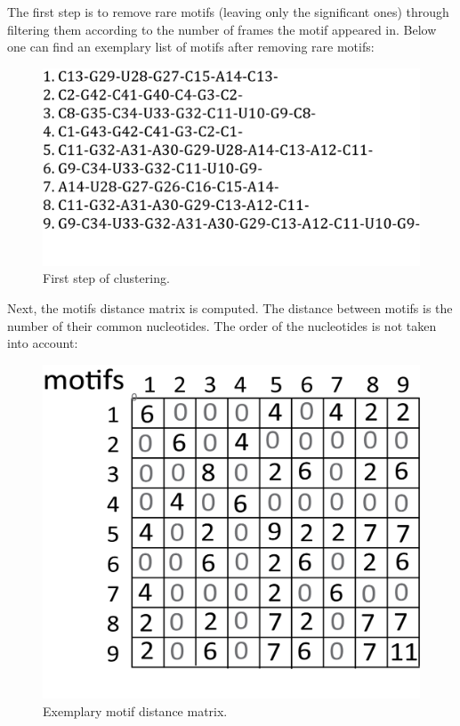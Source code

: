 \documentclass[12pt]{article}
\begin{document}
The first step is to remove rare motifs (leaving only the significant ones) through filtering them according to the number of frames the motif appeared in. Below one can find an exemplary list of motifs after removing rare motifs:

\begin{figure}[h!]
\centering
\includegraphics[scale=1]{./pictures/cluster_motif_step1.png}
\caption{First step of clustering.}
\label{MotifsClusteringStep1}
\end{figure}

Next, the motifs distance matrix is computed. The distance between motifs is the number of their common nucleotides. The order of the nucleotides is not taken into account:
\begin{figure}[h!]
\centering
\includegraphics[scale=0.6]{./pictures/cluster_motif_step2.png}
\caption{Exemplary motif distance matrix.}
\label{MotifsClusteringStep2}
\end{figure}
\end{document}
